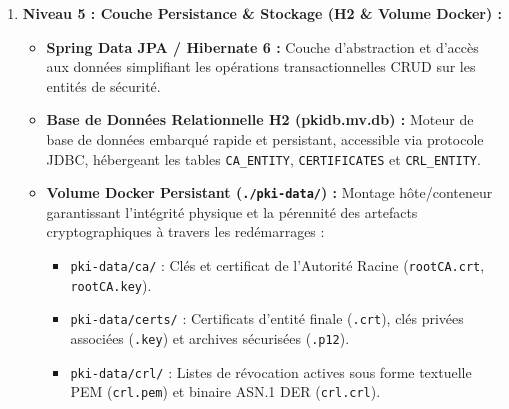 \documentclass[12pt,a4paper]{report}
\begin{document}
\begin{enumerate}
    \item \textbf{Niveau 5 : Couche Persistance \& Stockage (H2 \& Volume Docker) :}
    \begin{itemize}
        \item \textbf{Spring Data JPA / Hibernate 6 :} Couche d'abstraction et d'accès aux données simplifiant les opérations transactionnelles CRUD sur les entités de sécurité.
        \item \textbf{Base de Données Relationnelle H2 (pkidb.mv.db) :} Moteur de base de données embarqué rapide et persistant, accessible via protocole JDBC, hébergeant les tables \texttt{CA\_ENTITY}, \texttt{CERTIFICATES} et \texttt{CRL\_ENTITY}.
        \item \textbf{Volume Docker Persistant (\texttt{./pki-data/}) :} Montage hôte/conteneur garantissant l'intégrité physique et la pérennité des artefacts cryptographiques à travers les redémarrages :
        \begin{itemize}
            \item \texttt{pki-data/ca/} : Clés et certificat de l'Autorité Racine (\texttt{rootCA.crt}, \texttt{rootCA.key}).
            \item \texttt{pki-data/certs/} : Certificats d'entité finale (\texttt{.crt}), clés privées associées (\texttt{.key}) et archives sécurisées (\texttt{.p12}).
            \item \texttt{pki-data/crl/} : Listes de révocation actives sous forme textuelle PEM (\texttt{crl.pem}) et binaire ASN.1 DER (\texttt{crl.crl}).
        \end{itemize}
    \end{itemize}
\end{enumerate}
\end{document}

